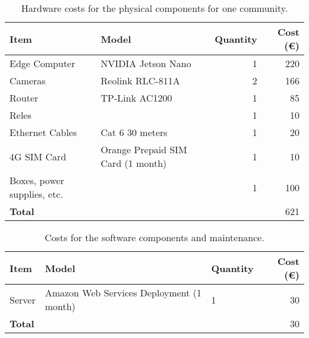 \begin{table}[H]
	\begin{tabular}{ l l r r }
		\toprule
		\textbf{Item}               & \textbf{Model}                                & \textbf{Quantity} & \textbf{Cost (\euro)} \\
		\midrule
		Edge Computer               & NVIDIA Jetson Nano \autocite{reComputerJ1010} & 1                 & 220                   \\
		Cameras                     & Reolink RLC-811A \autocite{ReolinkRLC811A}    & 2                 & 166                   \\
		Router                      & TP-Link AC1200 \autocite{TPLinkArcherMR600}   & 1                 & 85                    \\
		Reles                       &                                               & 1                 & 10                    \\
		Ethernet Cables             & Cat 6 30 meters                               & 1                 & 20                    \\
		4G SIM Card                 & Orange Prepaid SIM Card (1 month)             & 1                 & 10                    \\
		Boxes, power supplies, etc. &                                               & 1                 & 100                   \\
		\midrule
		\textbf{Total}              &                                               &                   & 621                   \\
		\bottomrule
	\end{tabular}
	\caption{Hardware costs for the physical components for one community.}\label{tab:hardware_costs_physical_components}
\end{table}

\begin{table}[H]
	\begin{tabular}{ l l l r }
		\toprule
		\textbf{Item}  & \textbf{Model}                           & \textbf{Quantity} & \textbf{Cost (\euro)} \\
		\midrule
		Server         & Amazon Web Services Deployment (1 month) & 1                 & 30                    \\
		\midrule
		\textbf{Total} &                                          &                   & 30                    \\
		\bottomrule
	\end{tabular}
	\caption{Costs for the software components and maintenance.}\label{tab:costs_software_components}
\end{table}

